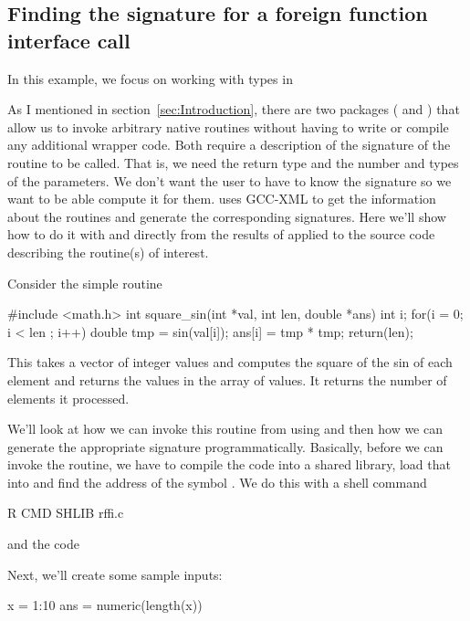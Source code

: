 \subsection{Finding the signature for a foreign function interface call}\label{sec:RffiEG}

In this example, we focus on working with types in 

As I mentioned in section~\ref{sec:Introduction}, there are two
packages ( and ) that allow us to invoke
arbitrary native routines without having to write or compile any
additional wrapper code.  Both require a description of the signature
of the routine to be called. That is, we need the return type and the
number and types of the parameters.  We don't want the user to have to
know the signature so we want to be able compute it for them.
 uses GCC-XML to get the information about the routines
and generate the corresponding signatures.  Here we'll show how to do
it with  and directly from the results of
 applied to the source code describing the
routine(s) of interest.

Consider the simple  routine
\begin{CCode}
#include <math.h>
int
square_sin(int *val, int len, double *ans)
{
    int i;
    for(i = 0; i < len ; i++) {
	double tmp = sin(val[i]);
	ans[i] = tmp * tmp;
    }
    return(len);
}
\end{CCode}
This takes a vector of integer values and computes the
square of the sin of each element and returns the values
in the array of  values. It returns the number
of elements it processed.

We'll look at how we can invoke this routine from using
 and then how we can generate the appropriate signature
programmatically.  Basically, before we can invoke the routine, we
have to compile the \C{} code into a shared
library, load that into \R{} and find the address of the symbol
.  We do this with a shell command
\begin{ShCode}
R CMD SHLIB rffi.c
\end{ShCode}
and the \R{} code

Next, we'll create some sample inputs:
\begin{RCode}
x = 1:10
ans = numeric(length(x))
\end{RCode}

